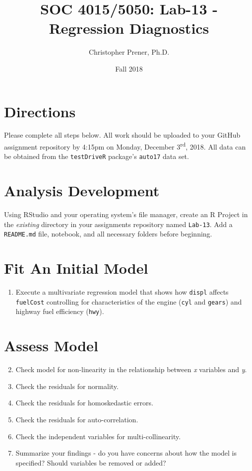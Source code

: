 \documentclass{tufte-handout}
\title{SOC 4015/5050: Lab-13 - Regression Diagnostics}
\author{Christopher Prener, Ph.D.}
\date{Fall 2018}
\begin{document}

\maketitle %


\vspace{5mm}
\section{Directions}
Please complete all steps below. All work should be uploaded to your GitHub assignment repository by 4:15pm on Monday, December 3\textsuperscript{rd}, 2018. All data can be obtained from the \texttt{testDriveR} package's \texttt{auto17} data set.

\vspace{5mm}
\section{Analysis Development}
Using RStudio and your operating system's file manager, create an R Project in the \textit{existing} directory in your assignments repository named \texttt{Lab-13}. Add a \texttt{README.md} file, notebook, and all necessary folders before beginning.

\vspace{3mm}
\section{Fit An Initial Model}
\begin{enumerate}
\item Execute a multivariate regression model that shows how \texttt{displ} affects \texttt{fuelCost} controlling for characteristics of the engine (\texttt{cyl} and \texttt{gears}) and highway fuel efficiency (\texttt{hwy}).
\end{enumerate}

\vspace{3mm}
\section{Assess Model}
\begin{enumerate}
\setcounter{enumi}{1}
\item Check model for non-linearity in the relationship between \textit{x} variables and \textit{y}.
\item Check the residuals for normality.
\item Check the residuals for homoskedastic errors.
\item Check the residuals for auto-correlation.
\item Check the independent variables for multi-collinearity.
\item Summarize your findings - do you have concerns about how the model is specified? Should variables be removed or added?
\end{enumerate}
\end{document}
